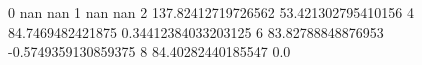0 nan nan
1 nan nan
2 137.82412719726562 53.421302795410156
4 84.7469482421875 0.34412384033203125
6 83.82788848876953 -0.5749359130859375
8 84.40282440185547 0.0
